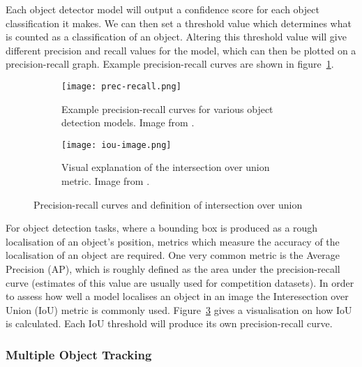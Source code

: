 \documentclass[../interim.tex]{subfiles}
\begin{document}
Each object detector model will output a confidence score for each object classification it makes. We can then set a threshold value which determines what is counted as a classification of an object. Altering this threshold value will give different precision and recall values for the model, which can then be plotted on a precision-recall graph. Example precision-recall curves are shown in figure~\ref{fig:prec-recall}.

\begin{figure}
  \centering
  \begin{subfigure}{0.48\textwidth}
    \texttt{[image: prec-recall.png]}
    \caption{Example precision-recall curves for various object detection models. Image from \cite{yolo}.}
    \label{fig:prec-recall}
  \end{subfigure}
  \hfill
  \begin{subfigure}{0.48\textwidth}
    \texttt{[image: iou-image.png]}
    \caption{Visual explanation of the intersection over union metric. Image from \cite{iou-image}.}
    \label{fig:iou}
  \end{subfigure}
  \caption{Precision-recall curves and definition of intersection over union}
\end{figure}

For object detection tasks, where a bounding box is produced as a rough localisation of an object's position, metrics which measure the accuracy of the localisation of an object are required. One very common metric is the Average Precision (AP), which is roughly defined as the area under the precision-recall curve (estimates of this value are usually used for competition datasets). In order to assess how well a model localises an object in an image the Interesection over Union (IoU) metric is commonly used. Figure~\ref{fig:iou} gives a visualisation on how IoU is calculated. Each IoU threshold will produce its own precision-recall curve.


\subsubsection{Multiple Object Tracking}
\end{document}
